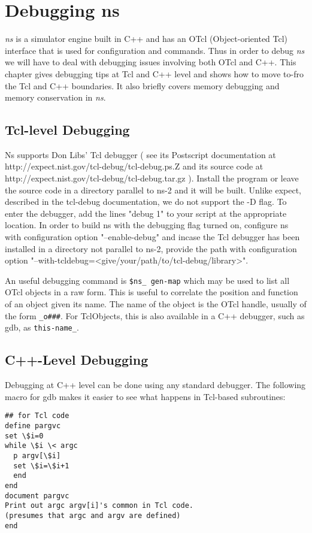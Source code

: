 \chapter{Debugging ns}
\label{sec:debug}

\emph{ns} is a simulator engine built in C++ and has an OTcl (Object-oriented
Tcl) interface that is used for configuration and commands. Thus in order
to debug \emph{ns} we will have to deal with debugging issues involving
both OTcl and C++. This chapter gives debugging tips at Tcl and C++
level and shows how to move to-fro the Tcl and C++ boundaries. It also
briefly covers memory debugging and memory conservation in \emph{ns}.


\section{Tcl-level Debugging}
\label{sec:tcldebug}

Ns supports Don Libs' Tcl debugger ( see its Postscript documentation at
http://expect.nist.gov/tcl-debug/tcl-debug.ps.Z and its source code at
http://expect.nist.gov/tcl-debug/tcl-debug.tar.gz ).
Install the program or leave the source code in a directory
parallel to ns-2 and it will be built. Unlike expect, described in the
tcl-debug documentation, we do not support the -D flag. To enter the
debugger, add the lines "debug 1" to your script at the appropriate
location. In order to build ns with the debugging flag turned on,
configure ns with configuration option "--enable-debug"
and incase the Tcl debugger has been installed in a directory not parallel
to ns-2, provide the path with configuration option 
"--with-tcldebug=<give/your/path/to/tcl-debug/library>".

An useful debugging command is {\tt \$ns\_ gen-map} which may be used to 
list all OTcl objects in a raw form. This is useful to correlate the
position and function of an object given its name. The name of the object
is the OTcl handle, usually of the form {\tt \_o###}. For TclObjects, this
is also available in a C++ debugger, such as gdb, as {\tt this-\>name\_}. 


\section{C++-Level Debugging}
\label{sec:cdebug}

Debugging at C++ level can be done using any standard debugger. The
following macro for gdb makes it easier to see what happens in Tcl-based
subroutines: 
\begin{verbatim}
## for Tcl code
define pargvc
set \$i=0
while \$i \< argc
  p argv[\$i]
  set \$i=\$i+1
  end
end
document pargvc
Print out argc argv[i]'s common in Tcl code.
(presumes that argc and argv are defined)
end
\end{verbatim}


